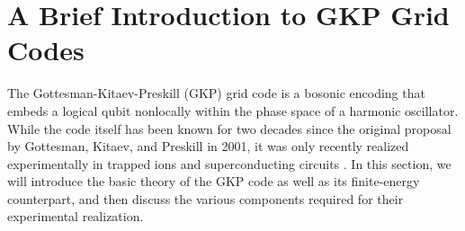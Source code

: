 \clearpage
\section{A Brief Introduction to GKP Grid Codes\label{sec:2_Intro_to_GKP}}

The Gottesman-Kitaev-Preskill (GKP) grid code is a bosonic encoding that embeds a logical qubit nonlocally within the phase space of a harmonic oscillator. While the code itself has been known for two decades since the original proposal by Gottesman, Kitaev, and Preskill \cite{gottesman2001gkp} in 2001, it was only recently realized experimentally in trapped ions \cite{fluhmann2019gkp-expt, deneeve2022gkp-expt} and superconducting circuits \cite{campagne2020gkp-expt, sivak2023gkp-expt, nordquantique2023gkp-expt}. In this section, we will introduce the basic theory of the GKP code as well as its finite-energy counterpart, and then discuss the various components required for their experimental realization. 

